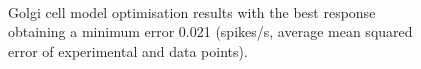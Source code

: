 


\begin{figure}[htb]
  \centering %
   \\
  \caption{Golgi cell model optimisation results with the best response obtaining a minimum error 0.021 (spikes/s, average mean squared error of experimental and data points). }\label{fig:GolgiResult}
\end{figure}











